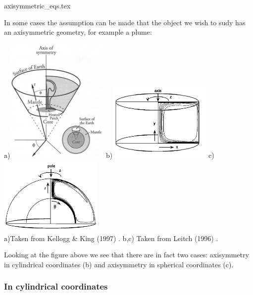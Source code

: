 \begin{flushright} {\tiny {\color{gray} axisymmetric\_eqs.tex}} \end{flushright}


In some cases the assumption can be made that the object we wish to sudy has an 
axisymmetric geometry, for example a plume:

\begin{center}
a)\includegraphics[width=5cm]{images/axisymmetry/keki97}
b)\includegraphics[width=5cm]{images/axisymmetry/lesy96a}
c)\includegraphics[width=5cm]{images/axisymmetry/lesy96b}\\
{\captionfont a)Taken from Kellogg \& King (1997) \cite{keki97}.
b,c) Taken from Leitch \etal (1996) \cite{lesy96}.}
\end{center}

Looking at the figure above we see that there are in fact two cases: axisymmetry in 
cylindrical coordinates (b) and axisymmetry in spherical coordinates (c).

\subsubsection{In cylindrical coordinates}

